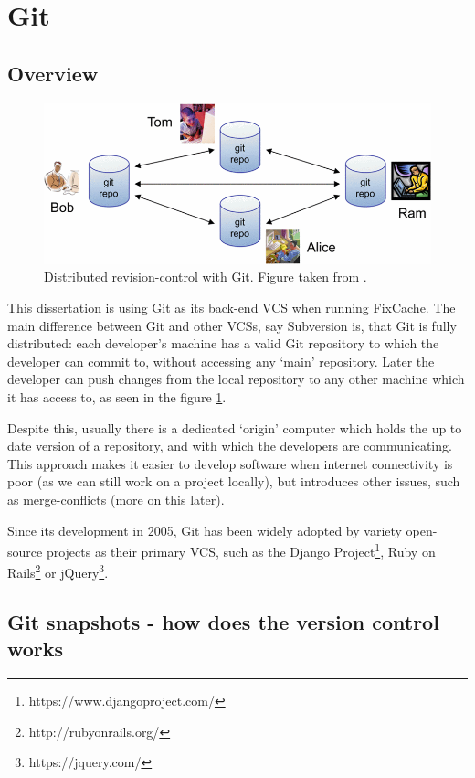 \documentclass[12pt,twoside,notitlepage]{report}
\newcommand{\fxch}{FixCache}
\begin{document}
\section{Git}\label{section-Git}
\subsection{Overview}
\begin{figure}[ht!]
\includegraphics[width=1.0\textwidth]{decentralised_git.png}
\caption[Distributed revision-control with Git]{Distributed revision-control with Git. Figure taken from \cite{TorvaldsGit}.}
\label{decentralised_git}
\end{figure}
This dissertation is using Git\cite{TorvaldsGit} as its back-end VCS when running \fxch{}. The main difference between Git and other VCSs, say Subversion is, that Git is fully distributed: each developer's machine has a valid Git repository to which the developer can commit to, without accessing any `main' repository. Later the developer can push changes from the local repository to any other machine which it has access to, as seen in the figure \ref{decentralised_git}.

Despite this, usually there is a dedicated `origin' computer which holds the up to date version of a repository, and with which the developers are communicating. This approach makes it easier to develop software when internet connectivity is poor (as we can still work on a project locally), but introduces other issues, such as merge-conflicts (more on this later). 

Since its development in 2005, Git has been widely adopted by variety open-source projects as their primary VCS, such as the Django Project\footnote{https://www.djangoproject.com/}, Ruby on Rails\footnote{http://rubyonrails.org/} or jQuery\footnote{https://jquery.com/}.
\subsection{Git snapshots - how does the version control works}
\end{document}
